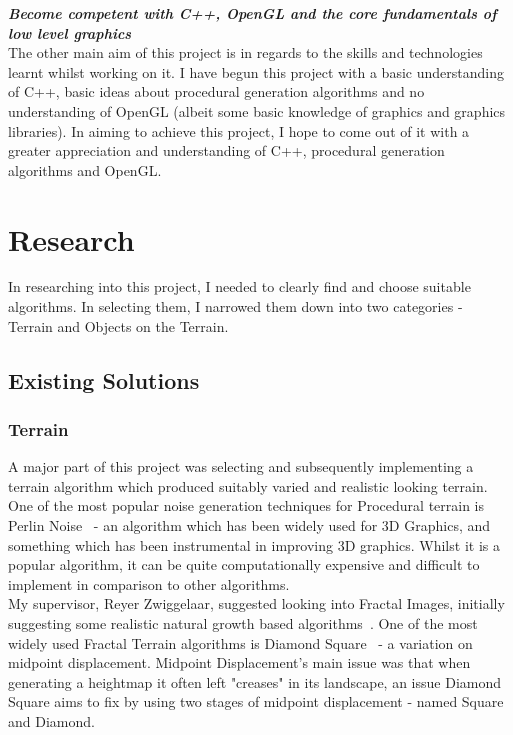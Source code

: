 \documentclass[a4paper,10pt]{report}
\begin{document}
\textbf{\textit{Become competent with C++, OpenGL and the core fundamentals of low level graphics}} \\

The other main aim of this project is in regards to the skills and technologies learnt whilst working on it. I have begun this project with a basic understanding of C++, basic ideas about procedural generation algorithms and no understanding of OpenGL (albeit some basic knowledge of graphics and graphics libraries). In aiming to achieve this project, I hope to come out of it with a greater appreciation and understanding of C++, procedural generation algorithms and OpenGL.\\

\chapter{Research}

In researching into this project, I needed to clearly find and choose suitable algorithms. In selecting them, I narrowed them down into two categories - Terrain and Objects on the Terrain. \\

\section{Existing Solutions}

\subsection{Terrain}

A major part of this project was selecting and subsequently implementing a terrain algorithm which produced suitably varied and realistic looking terrain. One of the most popular noise generation techniques for Procedural terrain is Perlin Noise~\cite{perlin2002improving} - an algorithm which has been widely used for 3D Graphics, and something which has been instrumental in improving 3D graphics. Whilst it is a popular algorithm, it can be quite computationally expensive and difficult to implement in comparison to other algorithms.\\

My supervisor, Reyer Zwiggelaar, suggested looking into Fractal Images, initially suggesting some realistic natural growth based algorithms~\cite{Bilsborough3424}. One of the most widely used Fractal Terrain algorithms is Diamond Square~\cite{olsen2004realtime} - a variation on midpoint displacement. Midpoint Displacement's main issue was that when generating a heightmap it often left "creases" in its landscape, an issue Diamond Square aims to fix by using two stages of midpoint displacement - named Square and Diamond.  \\
\end{document}
